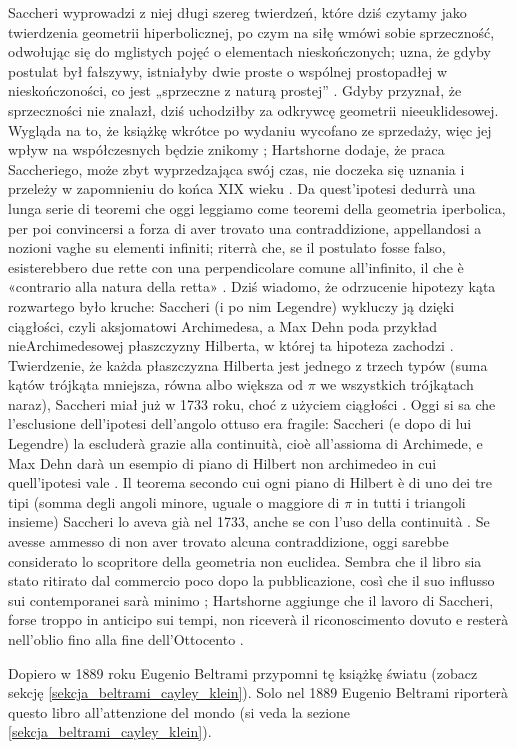 Saccheri wyprowadzi z niej długi szereg twierdzeń, które dziś czytamy jako twierdzenia geometrii hiperbolicznej, po czym na siłę wmówi sobie sprzeczność, odwołując się do mglistych pojęć o elementach nieskończonych; uzna, że gdyby postulat był fałszywy, istniałyby dwie proste o wspólnej prostopadłej w nieskończoności, co jest „sprzeczne z naturą prostej'' \cite[s. 305--306]{hartshorne_2000}. %
Gdyby przyznał, że sprzeczności nie znalazł, dziś uchodziłby za odkrywcę geometrii nieeuklidesowej. %
Wygląda na to, że książkę wkrótce po wydaniu wycofano ze sprzedaży, więc jej wpływ na współczesnych będzie znikomy \cite[s. 285]{eves1_1972}; Hartshorne dodaje, że praca Saccheriego, może zbyt wyprzedzająca swój czas, nie doczeka się uznania i przeleży w zapomnieniu do końca XIX wieku \cite[s. 306]{hartshorne_2000}. %
Da quest'ipotesi dedurrà una lunga serie di teoremi che oggi leggiamo come teoremi della geometria iperbolica, per poi convincersi a forza di aver trovato una contraddizione, appellandosi a nozioni vaghe su elementi infiniti; riterrà che, se il postulato fosse falso, esisterebbero due rette con una perpendicolare comune all'infinito, il che è «contrario alla natura della retta» \cite[p. 305--306]{hartshorne_2000}. %
Dziś wiadomo, że odrzucenie hipotezy kąta rozwartego było kruche: Saccheri (i po nim Legendre) wykluczy ją dzięki ciągłości, czyli aksjomatowi Archimedesa, a Max Dehn poda przykład nieArchimedesowej płaszczyzny Hilberta, w której ta hipoteza zachodzi \cite[s. 208--209]{greenberg_2010}. %
Twierdzenie, że każda płaszczyzna Hilberta jest jednego z trzech typów (suma kątów trójkąta mniejsza, równa albo większa od $\pi$ we wszystkich trójkątach naraz), Saccheri miał już w 1733 roku, choć z użyciem ciągłości \cite[s. 208]{greenberg_2010}. %
Oggi si sa che l'esclusione dell'ipotesi dell'angolo ottuso era fragile: Saccheri (e dopo di lui Legendre) la escluderà grazie alla continuità, cioè all'assioma di Archimede, e Max Dehn darà un esempio di piano di Hilbert non archimedeo in cui quell'ipotesi vale \cite[p. 208--209]{greenberg_2010}. %
Il teorema secondo cui ogni piano di Hilbert è di uno dei tre tipi (somma degli angoli minore, uguale o maggiore di $\pi$ in tutti i triangoli insieme) Saccheri lo aveva già nel 1733, anche se con l'uso della continuità \cite[p. 208]{greenberg_2010}. %
Se avesse ammesso di non aver trovato alcuna contraddizione, oggi sarebbe considerato lo scopritore della geometria non euclidea. %
Sembra che il libro sia stato ritirato dal commercio poco dopo la pubblicazione, così che il suo influsso sui contemporanei sarà minimo \cite[p. 285]{eves1_1972}; Hartshorne aggiunge che il lavoro di Saccheri, forse troppo in anticipo sui tempi, non riceverà il riconoscimento dovuto e resterà nell'oblio fino alla fine dell'Ottocento \cite[p. 306]{hartshorne_2000}. %

Dopiero w 1889 roku Eugenio Beltrami przypomni tę książkę światu (zobacz sekcję \ref{sekcja_beltrami_cayley_klein}). %
Solo nel 1889 Eugenio Beltrami riporterà questo libro all'attenzione del mondo (si veda la sezione \ref{sekcja_beltrami_cayley_klein}). %
